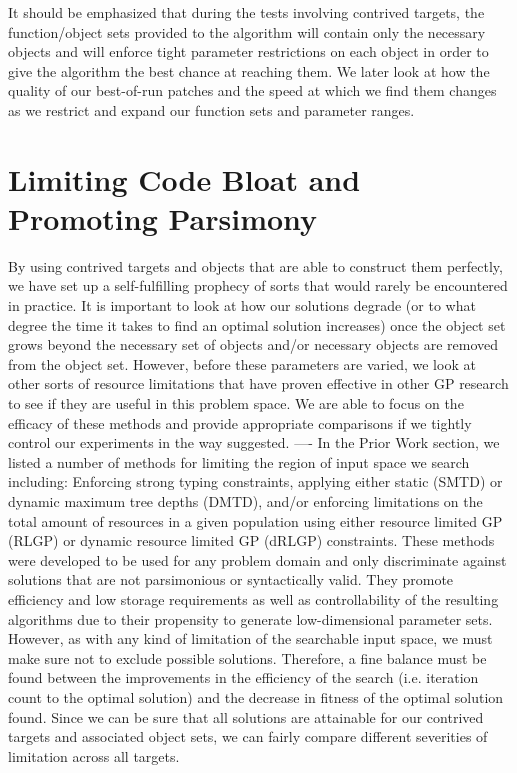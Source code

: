 \documentclass[12pt]{report} 	%
\numberwithin{figure}{chapter}
\numberwithin{table}{chapter}
\numberwithin{equation}{chapter}
\begin{document}
\begin{flushleft}
It should be emphasized that during the tests involving contrived targets, the function/object sets provided to the algorithm will contain only the necessary objects and will enforce tight parameter restrictions on each object in order to give the algorithm the best chance at reaching them. We later look at how the quality of our best-of-run patches and the speed at which we find them changes as we restrict and expand our function sets and parameter ranges.
\clearpage
\section{Limiting Code Bloat and Promoting Parsimony}
By using contrived targets and objects that are able to construct them perfectly, we have set up a self-fulfilling prophecy of sorts that would rarely be encountered in practice. It is important to look at how our solutions degrade (or to what degree the time it takes to find an optimal solution increases) once the object set grows beyond the necessary set of objects and/or necessary objects are removed from the object set. However, before these parameters are varied, we look at other sorts of resource limitations that have proven effective in other GP research to see if they are useful in this problem space. We are able to focus on the efficacy of these methods and provide appropriate comparisons if we tightly control our experiments in the way suggested.
----
In the Prior Work section, we listed a number of methods for limiting the region of input space we search including: Enforcing strong typing constraints, applying either static (SMTD) or dynamic maximum tree depths (DMTD), and/or enforcing limitations on the total amount of resources in a given population using either resource limited GP (RLGP) or dynamic resource limited GP (dRLGP) constraints. These methods were developed to be used for any problem domain and only discriminate against solutions that are not parsimonious or syntactically valid. They promote efficiency and low storage requirements as well as controllability of the resulting algorithms due to their propensity to generate low-dimensional parameter sets. However, as with any kind of limitation of the searchable input space, we must make sure not to exclude possible solutions. Therefore, a fine balance must be found between the improvements in the efficiency of the search (i.e. iteration count to the optimal solution) and the decrease in fitness of the optimal solution found. Since we can be sure that all solutions are attainable for our contrived targets and associated object sets, we can fairly compare different severities of limitation across all targets.


\end{flushleft}
\end{document}
